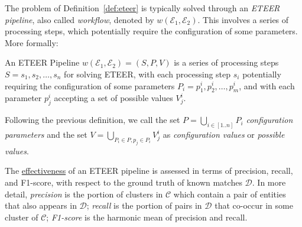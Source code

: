 
The problem of Definition~\ref{def:eteer} is typically solved through an \emph{ETEER pipeline}, also called \emph{workflow}, denoted by $w(\mathcal{E}_1, \mathcal{E}_2)$. This involves a series of processing steps, which potentially require the configuration of some parameters. More formally:
\vspace{4pt}
\begin{definition}
An ETEER Pipeline $w(\mathcal{E}_1, \mathcal{E}_2) = (S, P, V)$ is a series of processing steps $S = s_1, s_2, \ldots, s_n$ for solving ETEER, with each processing step $s_i$ potentially requiring the configuration of some parameters $P_i = p_1^i, p_2^i, \ldots, p_m^i$, and with each parameter $p_j^i$ accepting a set of possible values $V_j^i$.
\end{definition}
\vspace{4pt}

Following the previous definition, we 
call the set $P = \bigcup\limits_{i \in [1..n]}
P_i$ \emph{configuration parameters} and 
the set $V = \bigcup\limits_{P_i \in P, p_j \in P_i}V_j^i$ as \emph{configuration values} or \emph{possible values}.

The \underline{effectiveness} of an ETEER pipeline is assessed in terms of precision, recall, and F1-score, with respect to the ground truth of known matches $\mathcal{D}$. In more detail,
\textit{precision} is the portion of clusters in $\mathcal{C}$ which contain a pair of entities that also appears in $\mathcal{D}$; 
\textit{recall} is the portion of pairs in $\mathcal{D}$ that co-occur in some cluster of $\mathcal{C}$;
\textit{F1-score} is the harmonic mean of precision and recall.

